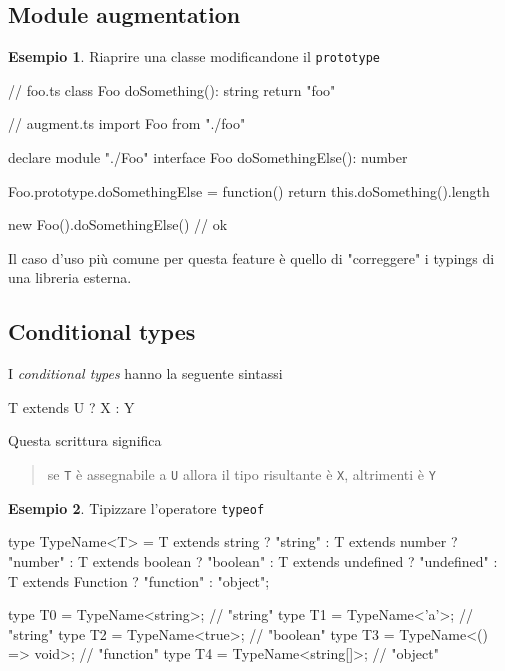 \documentclass[12pt]{article}
\theoremstyle{definition}
\newtheorem{example}{Esempio}[subsection]
\newenvironment{code}
  {\vspace{0.5cm} \VerbatimEnvironment\begin{typescriptcode}}
  {\end{typescriptcode} \vspace{0.2cm}}
\begin{document}
\subsection{Module augmentation}

\begin{example}
Riaprire una classe modificandone il \texttt{prototype}

\begin{code}
// foo.ts
class Foo {
  doSomething(): string {
    return "foo"
  }
}

// augment.ts
import { Foo } from "./foo"

declare module "./Foo" {
  interface Foo {
    doSomethingElse(): number
  }
}

Foo.prototype.doSomethingElse = function() {
  return this.doSomething().length
}

new Foo().doSomethingElse() // ok
\end{code}
\end{example}

Il caso d'uso più comune per questa feature è quello di "correggere" i typings di una libreria esterna.

\subsection{Conditional types}

I \emph{conditional types} hanno la seguente sintassi

\begin{code}
T extends U ? X : Y
\end{code}

Questa scrittura significa

\begin{quote}
se \texttt{T} è assegnabile a \texttt{U} allora il tipo risultante è \texttt{X}, altrimenti è \texttt{Y}
\end{quote}

\begin{example}
Tipizzare l'operatore \texttt{typeof}

\begin{code}
type TypeName<T> =
    T extends string ? "string" :
    T extends number ? "number" :
    T extends boolean ? "boolean" :
    T extends undefined ? "undefined" :
    T extends Function ? "function" :
    "object";

type T0 = TypeName<string>;  // "string"
type T1 = TypeName<'a'>;  // "string"
type T2 = TypeName<true>;  // "boolean"
type T3 = TypeName<() => void>;  // "function"
type T4 = TypeName<string[]>;  // "object"
\end{code}
\end{example}
\end{document}
